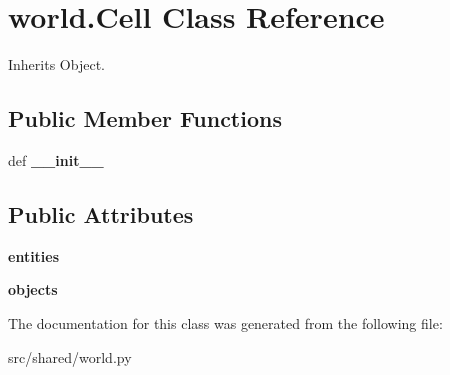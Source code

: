 \hypertarget{classworld_1_1_cell}{\section{world.\-Cell \-Class \-Reference}
\label{classworld_1_1_cell}
}


\-Inherits \-Object.

\subsection*{\-Public \-Member \-Functions}
\begin{DoxyCompactItemize}
\item 
\hypertarget{classworld_1_1_cell_a3dd387b6af13f7450acb97fb40c13a0e}{def {\bfseries \-\_\-\-\_\-init\-\_\-\-\_\-}}\label{classworld_1_1_cell_a3dd387b6af13f7450acb97fb40c13a0e}

\end{DoxyCompactItemize}
\subsection*{\-Public \-Attributes}
\begin{DoxyCompactItemize}
\item 
\hypertarget{classworld_1_1_cell_abacc61990c80c148f496f72be2f43dc6}{{\bfseries entities}}\label{classworld_1_1_cell_abacc61990c80c148f496f72be2f43dc6}

\item 
\hypertarget{classworld_1_1_cell_afd921144822811cc4c904bd1f0f3f746}{{\bfseries objects}}\label{classworld_1_1_cell_afd921144822811cc4c904bd1f0f3f746}

\end{DoxyCompactItemize}


\-The documentation for this class was generated from the following file\-:\begin{DoxyCompactItemize}
\item 
src/shared/world.\-py\end{DoxyCompactItemize}
